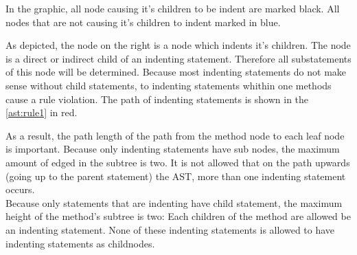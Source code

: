 In the graphic, all node causing it's children to be indent are marked black. All nodes that are not causing it's children to indent marked in blue. 

As depicted, the node on the right is a node which indents it's children. The node is a direct or indirect child of an indenting statement. Therefore all substatements of this node will be determined. Because most indenting statements do not make sense without child statements, to indenting statements whithin one methods cause a rule violation. The path of indenting statements is shown in the \ref{ast:rule1} in red.
\\

\label{ast:rule1}

As a result, the path length of the path from the method node to each leaf node is important. Because only indenting statements have sub nodes, the maximum amount of edged in the subtree is two. It is not allowed that on the path upwards (going up to the parent statement) the \acf{AST}, more than one indenting statement occurs. 
\\

Because only statements that are indenting have child statement, the maximum height of the method's subtree is two: Each children of the method are allowed be an indenting statement. None of these indenting statements is allowed to have indenting statements as childnodes. 
\\

